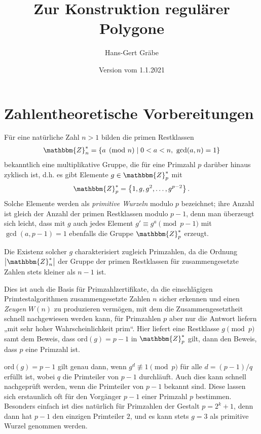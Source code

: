\documentclass[11pt]{article}
\author{Hans-Gert Gräbe}
\title{Zur Konstruktion regulärer Polygone}
\date{Version vom 1.1.2021}
\newcommand{\cbr}[1]{\ensuremath{\left\{#1\right\}}}
\newcommand{\Z}{\mathbbm{Z}}
\begin{document}
 
\maketitle         

\section{Zahlentheoretische Vorbereitungen}

Für eine natürliche Zahl $n>1$ bilden die primen Restklassen
\begin{gather*}
  \Z_n^\ast=\cbr{a \pmod n \mid 0<a<n,\ \gcd(a,n)=1}
\end{gather*}
bekanntlich eine multiplikative Gruppe, die für eine Primzahl $p$ darüber
hinaus zyklisch ist, d.h. es gibt Elemente $g\in \Z_p^\ast$ mit
\begin{gather*}
  \Z_p^\ast=\cbr{1,g,g^2,\dots,g^{p-2}}.
\end{gather*}
Solche Elemente werden als \emph{primitive Wurzeln} modulo $p$ bezeichnet;
ihre Anzahl ist gleich der Anzahl der primen Restklassen modulo $p-1$, denn
man überzeugt sich leicht, dass mit $g$ auch jedes Element $g'\equiv g^a
\pmod{p-1}$ mit $\gcd(a,p-1)=1$ ebenfalls die Gruppe $\Z_p^\ast$ erzeugt.

Die Existenz solcher $g$ charakterisiert zugleich Primzahlen, da die Ordnung
$\left|\Z_n^\ast\right|$ der Gruppe der primen Restklassen für
zusammengesetzte Zahlen stets kleiner als $n-1$ ist.

Dies ist auch die Basis für Primzahlzertifikate, da die einschlägigen
Primtestalgorithmen zusammengesetzte Zahlen $n$ sicher erkennen und einen
\emph{Zeugen} $W(n)$ zu produzieren vermögen, mit dem die Zusammengesetztheit
schnell nachgewiesen werden kann, für Primzahlen $p$ aber nur die Antwort
liefern „mit sehr hoher Wahrscheinlichkeit prim“. Hier liefert eine Restklasse
$g \pmod p$ samt dem Beweis, dass $\mathrm{ord}(g)=p-1$ in $\Z_p^\ast$ gilt,
dann den Beweis, dass $p$ eine Primzahl ist.

$\mathrm{ord}(g)=p-1$ gilt genau dann, wenn $g^d\not\equiv 1\pmod p$ für alle
$d=(p-1)/q$ erfüllt ist, wobei $q$ die Primteiler von $p-1$ durchläuft. Auch
dies kann schnell nachgeprüft werden, wenn die Primteiler von $p-1$ bekannt
sind.  Diese lassen sich erstaunlich oft für den Vorgänger $p-1$ einer
Primzahl $p$ bestimmen. Besonders einfach ist dies natürlich für Primzahlen
der Gestalt $p=2^k+1$, denn dann hat $p-1$ den einzigen Primteiler $2$, und es
kann stets $g=3$ als primitive Wurzel genommen werden.
\end{document}
